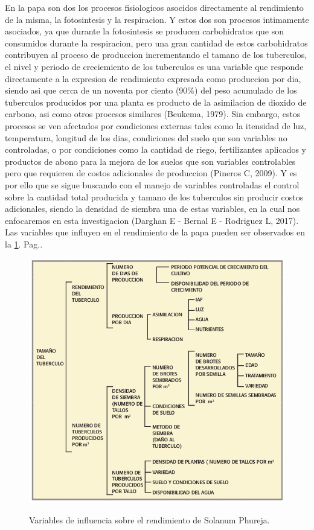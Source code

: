 En la papa son dos los procesos fisiologicos asocidos directamente al rendimiento de la misma, la fotosintesis y la respiracion. Y estos dos son procesos intimamente asociados, ya que durante la fotosintesis se producen carbohidratos que son consumidos durante la respiracion, pero una gran cantidad de estos carbohidratos contribuyen al proceso de produccion incrementando el tamano de los tuberculos, el nivel y periodo de creciemiento de los tuberculos es una variable que responde directamente a la expresion de rendimiento expresada como produccion por dia, siendo asi que cerca de un noventa por ciento (90\%) del peso acumulado de los tuberculos producidos por una planta es producto de la asimilacion de dioxido de carbono, asi como otros procesos similares (Beukema, 1979). Sin embargo, estos procesos se ven afectados por condiciones externas tales como la itensidad de luz, temperatura, longitud de los dias, condiciones del suelo que son variables no controladas, o por condiciones como la cantidad de riego, fertilizantes aplicados y productos de abono para la mejora de los suelos que son variables controlables pero que requieren de costos adicionales de produccion (Pineros C, 2009). Y es por ello que se sigue buscando con el manejo de variables controladas el control sobre la cantidad total producida y tamano de los tuberculos sin producir costos adicionales, siendo la densidad de siembra una de estas variables, en la cual nos enfocaremos en esta investigacion (Darghan E - Bernal E - Rodriguez L, 2017).\\

Las variables que influyen en el rendimiento de la papa pueden ser observados en la \ref{fig:arch}. Pag.\pageref{fig:arch}.\\
\begin{figure}[h]
	\caption{Variables de influencia sobre el rendimiento de Solanum Phureja.}
	\centering
	\includegraphics[scale=0.5]{variables.png}
	\label{fig:arch}
\end{figure}

